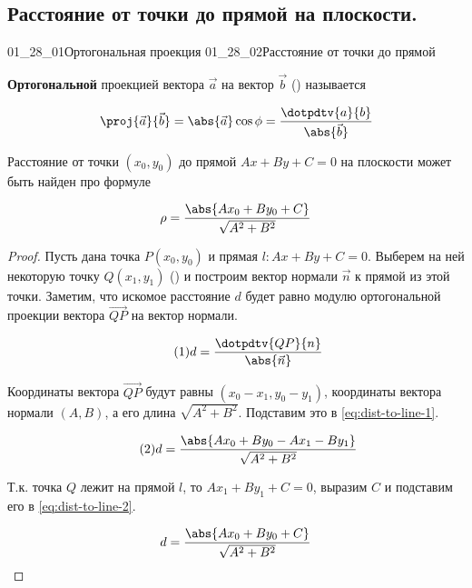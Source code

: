 \subsection{%
  Расстояние от точки до прямой на плоскости.%
}

\gallerydouble
  {01_28_01}{Ортогональная проекция}
  {01_28_02}{Расстояние от точки до прямой}

\begin{definition}
  \textbf{Ортогональной} проекцией вектора \(\vec{a}\) на вектор \(\vec{b}\)
  () называется 

  \begin{equation*}
    \proj{\vec{a}}{\vec{b}}
    = \abs{\vec{a}} \cos \phi
    = \frac{\dotpdtv{a}{b}}{\abs{\vec{b}}}
  \end{equation*}
\end{definition}

\begin{theorem}
  Расстояние от точки \((x_0, y_0)\) до прямой \(A x + B y + C = 0\) на
  плоскости может быть найден про формуле

  \begin{equation*}
    \rho = \frac{\abs{A x_0 + B y_0 + C}}{\sqrt{A^2 + B^2}}
  \end{equation*}
\end{theorem}

\begin{proof}
  Пусть дана точка \(P (x_0, y_0)\) и прямая \(l \colon A x + B y + C = 0\).
  Выберем на ней некоторую точку \(Q (x_1, y_1)\) () и построим
  вектор нормали \(\vec{n}\) к прямой из этой точки. Заметим, что искомое
  расстояние \(d\) будет равно модулю ортогональной проекции вектора
  \(\vec{QP}\) на вектор нормали.

  \begin{equation*} \label{eq:dist-to-line-1} \tag{1}
    d = \frac{\dotpdtv{QP}{n}}{\abs{\vec{n}}}
  \end{equation*}

  Координаты вектора \(\vec{QP}\) будут равны \((x_0 - x_1, y_0 - y_1)\),
  координаты вектора нормали \((A, B)\), а его длина \(\sqrt{A^2 + B^2}\).
  Подставим это в \eqref{eq:dist-to-line-1}.

  \begin{equation*} \label{eq:dist-to-line-2} \tag{2}
    d = \frac{\abs{A x_0 + B y_0 - A x_1 - B y_1}}{\sqrt{A^2 + B^2}}
  \end{equation*}

  Т.к. точка \(Q\) лежит на прямой \(l\), то \(A x_1 + B y_1 + C = 0\), выразим
  \(C\) и подставим его в \eqref{eq:dist-to-line-2}.

  \begin{equation*}
    d = \frac{\abs{A x_0 + B y_0 + C}}{\sqrt{A^2 + B^2}}
  \end{equation*}
\end{proof}

